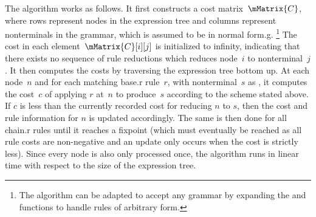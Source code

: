 \begin{algorithm}[p]
  \caption[%
            Algorithm for computing the optimal sequence of rules that reduces
            the given expression tree to a particular nonterminal%
          ]{%
            Computes the optimal sequence of rules that reduces the given
            expression tree to a particular nonterminal%
          }
\end{algorithm}

The algorithm works as follows.
%
It first constructs a cost matrix~$\mMatrix{C}$, where rows represent
\glspl{node} in the \gls{expression tree} and columns represent
\glspl{nonterminal} in the \gls{grammar}, which is assumed to be in \gls{normal
  form.g}.\!%
%
\footnote{%
  The algorithm can be adapted to accept any \gls{grammar} by expanding the
   and  functions to
  handle \glspl{rule} of arbitrary form.%
}
%
The cost in each element~\mbox{$\mMatrix{C}[i][j]$} is initialized to infinity,
indicating that there exists no sequence of \glspl{rule reduction} which reduces
\gls{node}~$i$ to \gls{nonterminal}~$j$\hspace{-1pt}.
%
It then computes the costs by traversing the \gls{expression tree} bottom up.
%
At each \gls{node}~$n$ and for each matching \gls{base.r} \gls{rule}~$r$\!, with
\gls{nonterminal}~$s$ as , it computes the cost~$c$ of
applying $r$ at~$n$ to produce~$s$ according to the scheme stated above.
%
If $c$ is less than the currently recorded cost for reducing $n$ to
$s$\hspace{-1pt}, then the cost and \gls{rule} information for $n$ is updated
accordingly.
%
The same is then done for all \gls{chain.r} \glspl{rule} until it reaches a
fixpoint (which must eventually be reached as all \gls{rule} costs are
non-negative and an update only occurs when the cost is strictly less).
%
Since every \gls{node} is also only processed once, the algorithm runs in linear
time with respect to the size of the \gls{expression tree}.

